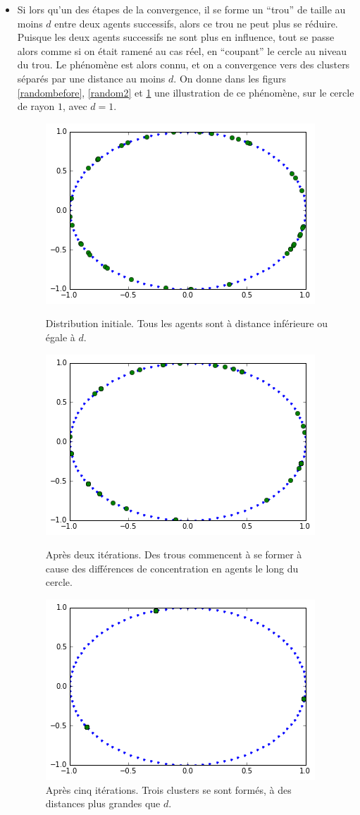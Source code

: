 \documentclass[a4paper,10pt]{article}
\begin{document}
\begin{itemize}
\item Si lors qu'un des étapes de la convergence, il se forme un ``trou'' de taille au moins $d$ entre deux agents successifs, alors ce trou ne peut plus se réduire. Puisque les deux agents successifs ne sont plus en influence, tout se passe alors comme si on était ramené au cas réel, en ``coupant'' le cercle au niveau du trou. Le phénomène est alors connu, et on a convergence vers des clusters séparés par une distance au moins $d$. On donne dans les figurs \ref{randombefore}, \ref{random2} et \ref{random5} une illustration de ce phénomène, sur le cercle de rayon $1$, avec $d = 1$.

\begin{figure}
\center
\includegraphics[scale=0.5]{randombefore.png}
\caption{Distribution initiale. Tous les agents sont à distance inférieure ou égale à $d$.}
\label{randombefore}
\center
\includegraphics[scale=0.5]{random2.png}
\caption{Après deux itérations. Des trous commencent à se former à cause des différences de concentration en agents le long du cercle.}
\label{random2}
\center
\includegraphics[scale=0.5]{random5.png}
\caption{Après cinq itérations. Trois clusters se sont formés, à des distances plus grandes que $d$.}
\label{random5}
\end{figure}


\end{itemize}
\end{document}
